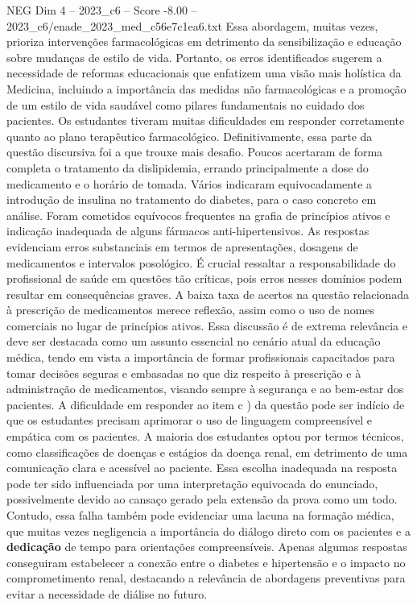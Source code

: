 \begin{textsample}{NEG Dim 4 – 2023\_c6 – Score -8.00 – 2023\_c6/enade\_2023\_med\_c56e7c1ea6.txt}
Essa abordagem, muitas vezes, prioriza intervenções farmacológicas em detrimento da sensibilização e educação sobre mudanças de estilo de vida.
Portanto, os erros identificados sugerem a necessidade de reformas educacionais que enfatizem uma visão mais holística da Medicina, incluindo a importância das medidas não farmacológicas e a promoção de um estilo de vida saudável como pilares fundamentais no cuidado dos pacientes.
Os estudantes tiveram muitas dificuldades em responder corretamente quanto ao plano terapêutico farmacológico.
Definitivamente, essa parte da questão discursiva foi a que trouxe mais desafio.
Poucos acertaram de forma completa o tratamento da dislipidemia, errando principalmente a dose do medicamento e o horário de tomada.
Vários indicaram equivocadamente a introdução de insulina no tratamento do diabetes, para o caso concreto em análise.
Foram cometidos equívocos frequentes na grafia de princípios ativos e indicação inadequada de alguns fármacos anti-hipertensivos.
As respostas evidenciam erros substanciais em termos de apresentações, dosagens de medicamentos e intervalos posológico.
É crucial ressaltar a responsabilidade do profissional de saúde em questões tão críticas, pois erros nesses domínios podem resultar em consequências graves.
A baixa taxa de acertos na questão relacionada à prescrição de medicamentos merece reflexão, assim como o uso de nomes comerciais no lugar de princípios ativos.
Essa discussão é de extrema relevância e deve ser destacada como um assunto essencial no cenário atual da educação médica, tendo em vista a importância de formar profissionais capacitados para tomar decisões seguras e embasadas no que diz respeito à prescrição e à administração de medicamentos, visando sempre à segurança e ao bem-estar dos pacientes.
A dificuldade em responder ao item c ) da questão pode ser indício de que os estudantes precisam aprimorar o uso de linguagem compreensível e empática com os pacientes.
A maioria dos estudantes optou por termos técnicos, como classificações de doenças e estágios da doença renal, em detrimento de uma comunicação clara e acessível ao paciente.
Essa escolha inadequada na resposta pode ter sido influenciada por uma interpretação equivocada do enunciado, possivelmente devido ao cansaço gerado pela extensão da prova como um todo.
Contudo, essa falha também pode evidenciar uma lacuna na formação médica, que muitas vezes negligencia a importância do diálogo direto com os pacientes e a \textbf{dedicação} de tempo para orientações compreensíveis.
Apenas algumas respostas conseguiram estabelecer a conexão entre o diabetes e hipertensão e o impacto no comprometimento renal, destacando a relevância de abordagens preventivas para evitar a necessidade de diálise no futuro.

\end{textsample}

